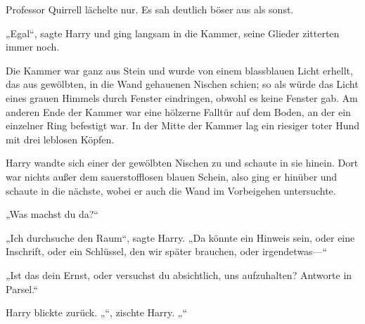 Professor Quirrell lächelte nur. Es sah deutlich böser aus als sonst.

„Egal“, sagte Harry und ging langsam in die Kammer, seine Glieder zitterten immer noch.

Die Kammer war ganz aus Stein und wurde von einem blassblauen Licht erhellt, das aus gewölbten, in die Wand gehauenen Nischen schien; so als würde das Licht eines grauen Himmels durch Fenster eindringen, obwohl es keine Fenster gab. Am anderen Ende der Kammer war eine hölzerne Falltür auf dem Boden, an der ein einzelner Ring befestigt war. In der Mitte der Kammer lag ein riesiger toter Hund mit drei leblosen Köpfen.

Harry wandte sich einer der gewölbten Nischen zu und schaute in sie hinein. Dort war nichts außer dem sauerstofflosen blauen Schein, also ging er hinüber und schaute in die nächste, wobei er auch die Wand im Vorbeigehen untersuchte.

„Was machst du da?“

„Ich durchsuche den Raum“, sagte Harry. „Da könnte ein Hinweis sein, oder eine Inschrift, oder ein Schlüssel, den wir später brauchen, oder irgendetwas—“

„Ist das dein Ernst, oder versuchst du absichtlich, uns aufzuhalten? Antworte in Parsel.“

Harry blickte zurück.
„“, zischte Harry. „“

